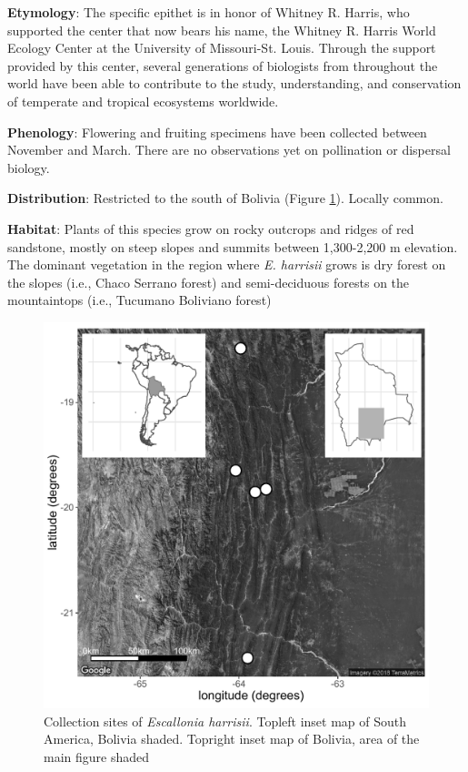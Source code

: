 \documentclass[fleqn,10pt,lineno]{wlpeerj} %
\begin{document}
\textbf{Etymology}: The specific epithet is in honor of Whitney R. Harris, who supported the center that now bears his name, the Whitney R. Harris World Ecology Center at the University of Missouri-St. Louis. Through the support provided by this center, several generations of biologists from throughout the world have been able to contribute to the study, understanding, and conservation of temperate and tropical ecosystems worldwide.

\textbf{Phenology}: Flowering and fruiting specimens have been collected between November and March. There are no observations yet on pollination or dispersal biology.

\textbf{Distribution}: Restricted to the south of Bolivia (Figure \ref{fig:fig7}). Locally common.

\textbf{Habitat}: Plants of this species grow on rocky outcrops and ridges of red sandstone, mostly on steep slopes and summits between 1,300-2,200 m elevation. The dominant vegetation in the region where \emph{E. harrisii} grows is dry forest on the slopes (i.e., Chaco Serrano forest) and semi-deciduous forests on the mountaintops (i.e., Tucumano Boliviano forest) 

\begin{figure}[ht]
\centering
\includegraphics[width=\linewidth]{fig7}
\caption{Collection sites of \emph{Escallonia harrisii}. Topleft inset map of South America, Bolivia shaded. Topright inset map of Bolivia, area of the main figure shaded}
\label{fig:fig7}
\end{figure}
\end{document}
